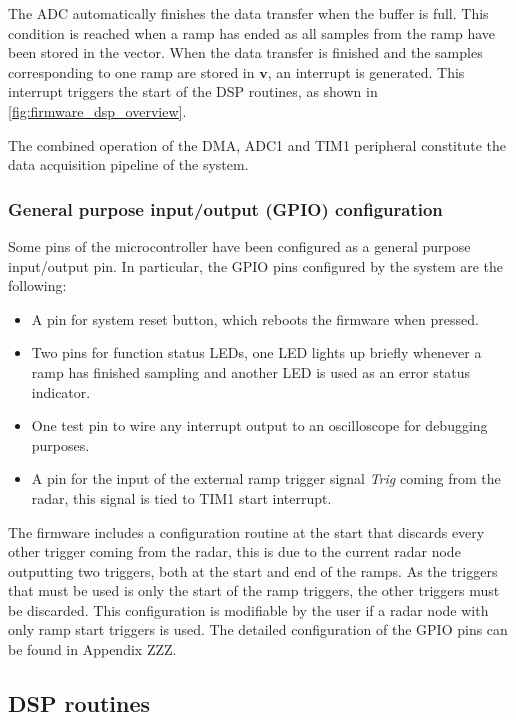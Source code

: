 The ADC automatically finishes the data transfer when the buffer is full. This condition is reached when a ramp has ended as all samples from the ramp have been stored in the vector. When the data transfer is finished and the samples corresponding to one ramp are stored in $\mathbf{v}$, an interrupt is generated. This interrupt triggers the start of the DSP routines, as shown in \cref{fig:firmware_dsp_overview}.

The combined operation of the DMA, ADC1 and TIM1 peripheral constitute the data acquisition pipeline of the system.

\subsubsection{General purpose input/output (GPIO) configuration}

Some pins of the microcontroller have been configured as a general purpose input/output pin. In particular, the GPIO pins configured by the system are the following:
\begin{itemize}
	\item A pin for system reset button, which reboots the firmware when pressed.
	\item Two pins for function status LEDs, one LED lights up briefly whenever a ramp has finished sampling and another LED is used as an error status indicator.
	\item One test pin to wire any interrupt output to an oscilloscope for debugging purposes.
	\item A pin for the input of the external ramp trigger signal \textit{Trig} coming from the radar, this signal is tied to TIM1 start interrupt.
\end{itemize}

The firmware includes a configuration routine at the start that discards every other trigger coming from the radar, this is due to the current radar node outputting two triggers, both at the start and end of the ramps. As the triggers that must be used is only the start of the ramp triggers, the other triggers must be discarded. This configuration is modifiable by the user if a radar node with only ramp start triggers is used. The detailed configuration of the GPIO pins can be found in Appendix ZZZ.

\subsection{DSP routines} \label{sec:dsp_routines}

